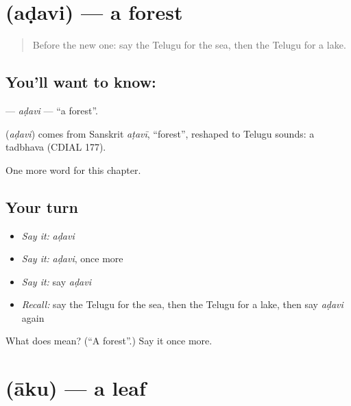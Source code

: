 \section[\texorpdfstring{\te{అడవి} (aḍavi)}{అడవి (aḍavi)}]{ (aḍavi) — a forest}

\label{lesson:TE-C120-adavi}



\begin{quote}
Before the new one: say the Telugu for the sea, then the Telugu for a lake.
\end{quote}

\subsection*{You'll want to know: }
\textbf{} — \emph{aḍavi} — \textquotedblleft{}a forest\textquotedblright{}.

\begin{cousinweb}
\textbf{} (\emph{aḍavi}) comes from Sanskrit \emph{aṭavī}, \textquotedblleft{}forest\textquotedblright{}, reshaped to Telugu sounds: a tadbhava (CDIAL 177).
\end{cousinweb}

\begin{grammarlens}[title={What you've built}]
One more word for this chapter.
\end{grammarlens}

\subsection*{Your turn}
\begin{itemize}
\raggedright
  \item \emph{Say it:} \emph{aḍavi}
  \item \emph{Say it:} \emph{aḍavi}, once more
  \item \emph{Say it:} say \emph{aḍavi}
  \item \emph{Recall:} say the Telugu for the sea, then the Telugu for a lake, then say \emph{aḍavi} again
\end{itemize}

\begin{tcolorbox}[breakable,colback=teal!4,colframe=teal!35!black,title={Before you move on}]
What does  mean? (\textquotedblleft{}A forest\textquotedblright{}.) Say it once more.
\end{tcolorbox}
\section[\texorpdfstring{\te{ఆకు} (āku)}{ఆకు (āku)}]{ (āku) — a leaf}

